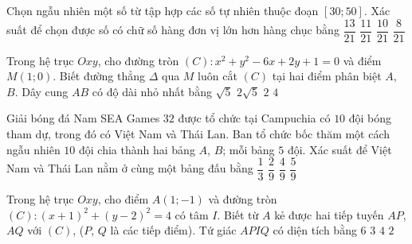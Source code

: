 \begin{ex}%
	Chọn ngẫu nhiên một số từ tập hợp các số tự nhiên thuộc đoạn $[30;50]$. Xác suất để chọn được số có chữ số hàng đơn vị lớn hơn hàng chục bằng
	\choice
	{$\dfrac{13}{21}$}
	{\True $\dfrac{11}{21}$}
	{$\dfrac{10}{21}$}
	{$\dfrac{8}{21}$}
\end{ex} 

\begin{ex}%
	Trong hệ trục $Oxy$, cho đường tròn $(C)\colon x^{2}+y^{2}-6x+2y+1=0$ và điểm $M(1; 0)$. Biết đường thẳng $\Delta$ qua $M$ luôn cắt $(C)$ tại hai điểm phân biệt $A$, $B$. Dây cung $AB$ có độ dài nhỏ nhất bằng
	\choice
	{$\sqrt{5}$}
	{$2\sqrt{5}$}
	{$2$}
	{\True $4$}
\end{ex} 

\begin{ex}%
	Giải bóng đá Nam SEA Games $32$ được tổ chức tại Campuchia có $10$ đội bóng tham dự, trong đó có Việt Nam và Thái Lan. Ban tổ chức bốc thăm một cách ngẫu nhiên $10$ đội chia thành hai bảng $A$, $B$; mỗi bảng $5$ đội. Xác suất để Việt Nam và Thái Lan nằm ở cùng một bảng đấu bằng
	\choice
	{$\dfrac{1}{3}$}
	{$\dfrac{2}{9}$}
	{\True $\dfrac{4}{9}$}
	{$\dfrac{5}{9}$}
\end{ex} 

\begin{ex}%
	Trong hệ trục $Oxy$, cho điểm $A(1;-1)$ và đường tròn $(C)\colon (x+1)^{2}+(y-2)^{2}=4$ có tâm $I$. Biết từ $A$ kẻ được hai tiếp tuyến $AP$, $AQ$ với $(C)$, ($P$, $Q$ là các tiếp điểm). Tứ giác $APIQ$ có diện tích bằng
	\choice
	{\True $6$}
	{$3$}
	{$4$}
	{$2$}
\end{ex} 

